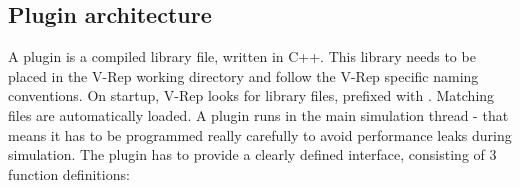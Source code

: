 

\subsection{Plugin architecture}

A plugin is a compiled library file, written in C++. This library needs to be placed in the V-Rep working directory and follow the V-Rep specific naming conventions. On startup, V-Rep looks for library files, prefixed with . Matching files are automatically loaded. A plugin runs in the main simulation thread -  that means it has to be programmed really carefully to avoid performance leaks during simulation. The plugin has to provide a clearly defined interface, consisting of 3 function definitions:

